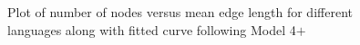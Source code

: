 \documentclass[a4paper]{article}
\begin{document}
\begin{figure}[hbtp]
	\centering
	\quad
	\caption{Plot of number of nodes versus mean edge length for different languages along with fitted curve following Model 4$+$}
	
\end{figure}
\end{document}
